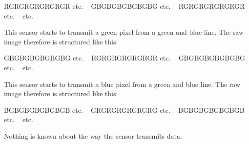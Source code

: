\begin{Desc}
\begin{description}
R\+G\+R\+G\+R\+G\+R\+G\+R\+G\+R\+G\+R etc. ~\newline
G\+B\+G\+B\+G\+B\+G\+B\+G\+B\+G\+B\+G etc. ~\newline
R\+G\+R\+G\+R\+G\+R\+G\+R\+G\+R\+G\+R etc. ~\newline
etc. ~\newline
{}\item[{\em 
\hypertarget{group___device_specific_interface_gga3a851956283d4fe464e3e9e2e1c85734a19d15b960ec09b1d422e29cba0e9aa88}{iscp\+Blue\+Green}\label{group___device_specific_interface_gga3a851956283d4fe464e3e9e2e1c85734a19d15b960ec09b1d422e29cba0e9aa88}
}]This sensor starts to transmit a green pixel from a green and blue line. The raw image therefore is structured like this\+:

G\+B\+G\+B\+G\+B\+G\+B\+G\+B\+G\+B\+G etc. ~\newline
R\+G\+R\+G\+R\+G\+R\+G\+R\+G\+R\+G\+R etc. ~\newline
G\+B\+G\+B\+G\+B\+G\+B\+G\+B\+G\+B\+G etc. ~\newline
etc. ~\newline
{}\item[{\em 
\hypertarget{group___device_specific_interface_gga3a851956283d4fe464e3e9e2e1c85734a6b055600cdbc2600101d2d802dfe58d1}{iscp\+Green\+Blue}\label{group___device_specific_interface_gga3a851956283d4fe464e3e9e2e1c85734a6b055600cdbc2600101d2d802dfe58d1}
}]This sensor starts to transmit a blue pixel from a green and blue line. The raw image therefore is structured like this\+:

B\+G\+B\+G\+B\+G\+B\+G\+B\+G\+B\+G\+B etc. ~\newline
G\+R\+G\+R\+G\+R\+G\+R\+G\+R\+G\+R\+G etc. ~\newline
B\+G\+B\+G\+B\+G\+B\+G\+B\+G\+B\+G\+B etc. ~\newline
etc. ~\newline
{}\item[{\em 
\hypertarget{group___device_specific_interface_gga3a851956283d4fe464e3e9e2e1c85734a93a09c12342670d8e7128a1c81940a00}{iscp\+Unknown}\label{group___device_specific_interface_gga3a851956283d4fe464e3e9e2e1c85734a93a09c12342670d8e7128a1c81940a00}
}]Nothing is known about the way the sensor transmits data. \end{description}
\end{Desc}
